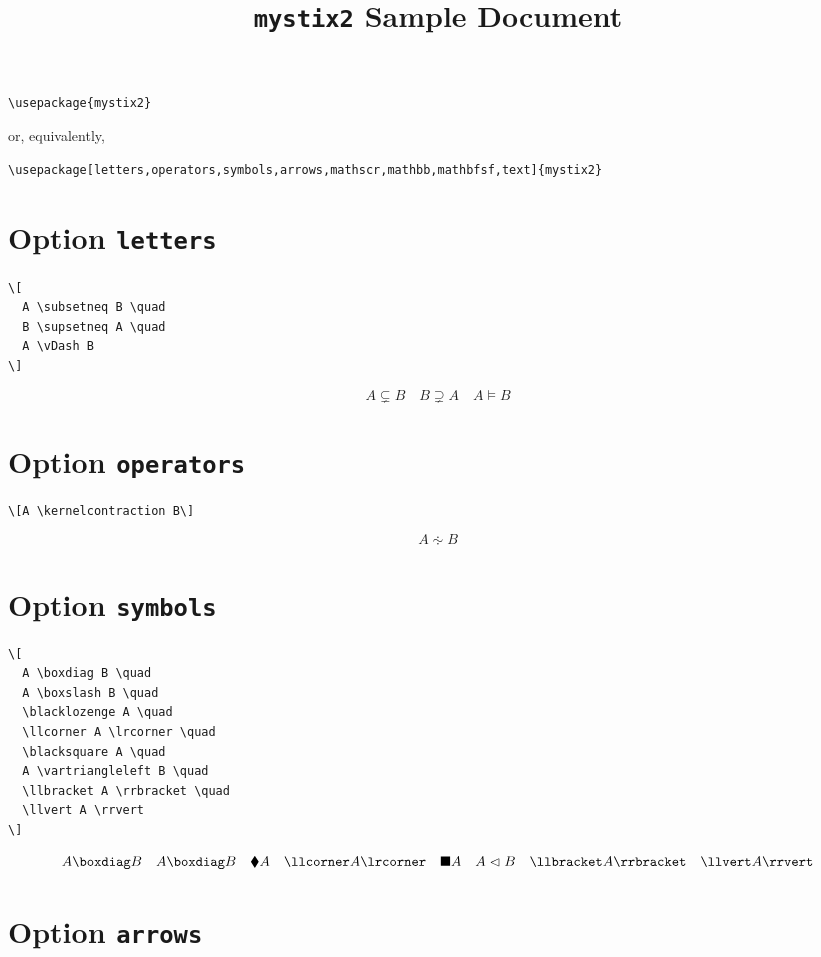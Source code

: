 \documentclass{article}
\begin{document}
\title{\texttt{mystix2} Sample Document}
\author{}
\date{}

\maketitle

\begin{verbatim}
\usepackage{mystix2}
\end{verbatim}
%
or, equivalently,
%
\begin{verbatim}
\usepackage[letters,operators,symbols,arrows,mathscr,mathbb,mathbfsf,text]{mystix2}
\end{verbatim}

\section{Option \texttt{letters}}

\begin{verbatim}
\[
  A \subsetneq B \quad
  B \supsetneq A \quad
  A \vDash B
\]
\end{verbatim}
%
\[
  A \subsetneq B \quad
  B \supsetneq A \quad
  A \vDash B
\]

\section{Option \texttt{operators}}

\begin{verbatim}
\[A \kernelcontraction B\]
\end{verbatim}
%
\[A \kernelcontraction B\]

\section{Option \texttt{symbols}}

\begin{verbatim}
\[
  A \boxdiag B \quad
  A \boxslash B \quad
  \blacklozenge A \quad
  \llcorner A \lrcorner \quad
  \blacksquare A \quad
  A \vartriangleleft B \quad
  \llbracket A \rrbracket \quad
  \llvert A \rrvert
\]
\end{verbatim}
%
\[
  A \boxdiag B \quad
  A \boxslash B \quad
  \blacklozenge A \quad
  \llcorner A \lrcorner \quad
  \blacksquare A \quad
  A \vartriangleleft B \quad
  \llbracket A \rrbracket \quad
  \llvert A \rrvert
\]

\section{Option \texttt{arrows}}
\end{document}
